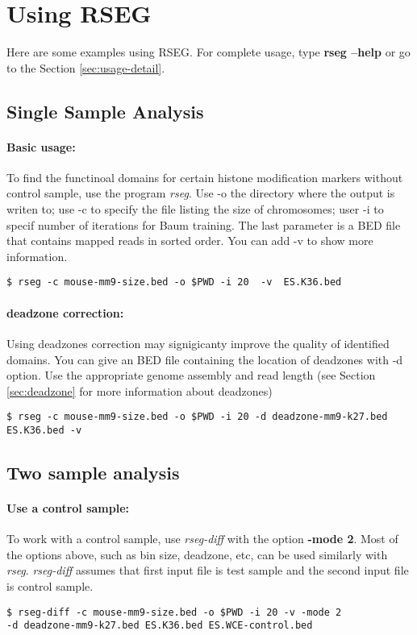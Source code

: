 \documentclass[11pt]{report}
\begin{document}
\section{Using RSEG}
\label{sec:usage}

Here are some examples using RSEG. For complete usage, type \textbf{rseg
 --help} or go to the Section \ref{sec:usage-detail}.

\subsection{Single Sample Analysis}
\label{sec:use-rseg}

\paragraph{Basic usage:} 
To find the functinoal domains for certain histone modification
markers without control sample, use the program \textit{rseg}. Use -o the
directory where the output is writen to; use -c to specify the file
listing the size of chromosomes; user -i to specif number of
iterations for Baum training. The last parameter is a BED file that
contains mapped reads in sorted order. You can add -v to show more
information.
\begin{verbatim}
$ rseg -c mouse-mm9-size.bed -o $PWD -i 20  -v  ES.K36.bed
\end{verbatim}

\paragraph{deadzone correction:}
Using deadzones correction may signigicanty improve the quality of
identified domains. You can give an BED file containing the location
of deadzones with -d option. Use the appropriate genome assembly and
read length (see Section \ref{sec:deadzone} for more information about
deadzones)
\begin{verbatim}
$ rseg -c mouse-mm9-size.bed -o $PWD -i 20 -d deadzone-mm9-k27.bed 
ES.K36.bed -v
\end{verbatim}


\subsection{Two sample analysis}
\label{sec:use-rseg-diff}


\paragraph{Use a control sample:}
To work with a control sample, use \textit{rseg-diff} with the option
\textbf{-mode 2}. Most of the options above, such as bin size, deadzone, etc,
can be used similarly with \textit{rseg}. \textit{rseg-diff} assumes that first
input file is test sample and the second input file is control sample.
\begin{verbatim}
$ rseg-diff -c mouse-mm9-size.bed -o $PWD -i 20 -v -mode 2
-d deadzone-mm9-k27.bed ES.K36.bed ES.WCE-control.bed
\end{verbatim}
\end{document}
